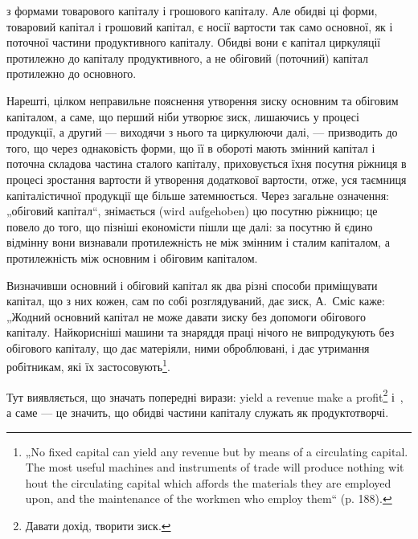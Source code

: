 \parcont{}  %
з формами товарового капіталу і грошового капіталу. Але обидві ці форми,
товаровий капітал і грошовий капітал, є носії вартости так само
основної, як і поточної частини продуктивного капіталу. Обидві вони є
капітал циркуляції протилежно до капіталу продуктивного, а не обіговий
(поточний) капітал протилежно до основного.

Нарешті, цілком неправильне пояснення утворення зиску основним
та обіговим капіталом, а саме, що перший ніби утворює зиск, лишаючись
у процесі продукції, а другий — виходячи з нього та циркулюючи далі, —
призводить до того, що через однаковість форми, що її в обороті
мають змінний капітал і поточна складова частина сталого капіталу, приховується
їхня посутня ріжниця в процесі зростання вартости й
утворення додаткової вартости, отже, уся таємниця капіталістичної продукції
ще більше затемнюється. Через загальне означення: „обіговий капітал“,
знімається (wird aufgehoben) цю посутню ріжницю; це повело до
того, що пізніші економісти пішли ще далі: за посутню й єдино відмінну
вони визнавали протилежність не між змінним і сталим капіталом, а
протилежність між основним і обіговим капіталом.

Визначивши основний і обіговий капітал як два різні способи приміщувати
капітал, що з них кожен, сам по собі розглядуваний, дає зиск,
А.~Сміс каже: „Жодний основний капітал не може давати зиску без допомоги
обігового капіталу. Найкорисніші машини та знаряддя праці нічого
не випродукують без обігового капіталу, що дає матеріяли, ними
оброблювані, і дає утримання робітникам, які їх застосовують\footnote*{
„No fixed capital can yield any revenue but by means of a circulating capital.
The most useful machines and instruments of trade will produce nothing wit
hout the circulating capital which affords the materials they are employed upon, and
the maintenance of the workmen who employ them“ (p. 188).
}.

Тут виявляється, що значать попередні вирази: yield a revenue make
a profit\footnote*{
Давати дохід, творити зиск.
} і~, а саме — це значить, що обидві частини капіталу служать
як продуктотворчі.

